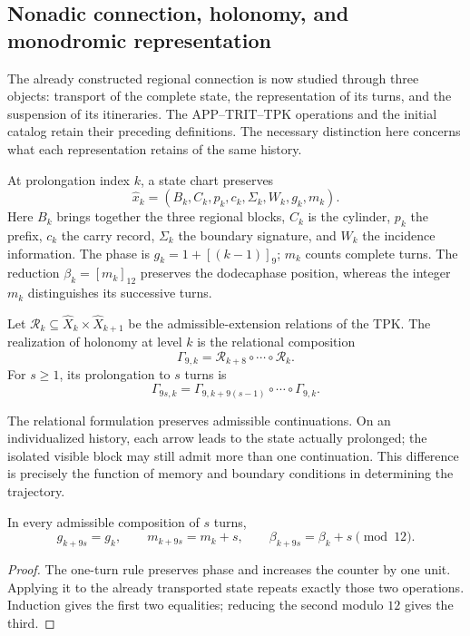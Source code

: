 \subsection{Nonadic connection, holonomy, and monodromic representation}
\label{mono-ampl:conexion}

The already constructed regional connection is now studied through three objects:
transport of the complete state, the representation of its turns, and the
suspension of its itineraries. The APP--TRIT--TPK operations and the
initial catalog retain their preceding definitions. The necessary
distinction here concerns what each representation retains of the
same history.

At prolongation index \(k\), a state chart preserves
\[
 \widehat x_k=(B_k,C_k,p_k,c_k,\Sigma_k,W_k,g_k,m_k).
\]
Here \(B_k\) brings together the three regional blocks, \(C_k\) is the cylinder,
\(p_k\) the prefix, \(c_k\) the carry record, \(\Sigma_k\) the boundary
signature, and \(W_k\) the incidence information. The phase is
\(g_k=1+[(k-1)]_9\); \(m_k\) counts complete turns. The reduction
\(\beta_k=[m_k]_{12}\) preserves the dodecaphase position, whereas the
integer \(m_k\) distinguishes its successive turns.

\begin{definition}
\label{mono-ampl:def-vuelta}
Let \(\mathcal R_k\subseteq\widehat X_k\times\widehat X_{k+1}\)
be the admissible-extension relations of the TPK. The realization of
holonomy at level \(k\) is the relational composition
\[
 \Gamma_{9,k}=\mathcal R_{k+8}\circ\cdots\circ\mathcal R_k.
\]
For \(s\geq1\), its prolongation to \(s\) turns is
\[
 \Gamma_{9s,k}=
 \Gamma_{9,k+9(s-1)}\circ\cdots\circ\Gamma_{9,k}.
\]
\end{definition}

The relational formulation preserves admissible continuations. On
an individualized history, each arrow leads to the state actually
prolonged; the isolated visible block may still admit more than one
continuation. This difference is precisely the function of memory and
boundary conditions in determining the trajectory.

\begin{proposition}
\label{mono-ampl:vueltas}
In every admissible composition of \(s\) turns,
\[
 g_{k+9s}=g_k,\qquad m_{k+9s}=m_k+s,\qquad
 \beta_{k+9s}=\beta_k+s\pmod{12}.
\]
\end{proposition}
\begin{proof}
The one-turn rule preserves phase and increases the counter by one
unit. Applying it to the already transported state repeats exactly those
two operations. Induction gives the first two equalities; reducing the
second modulo \(12\) gives the third.
\end{proof}

